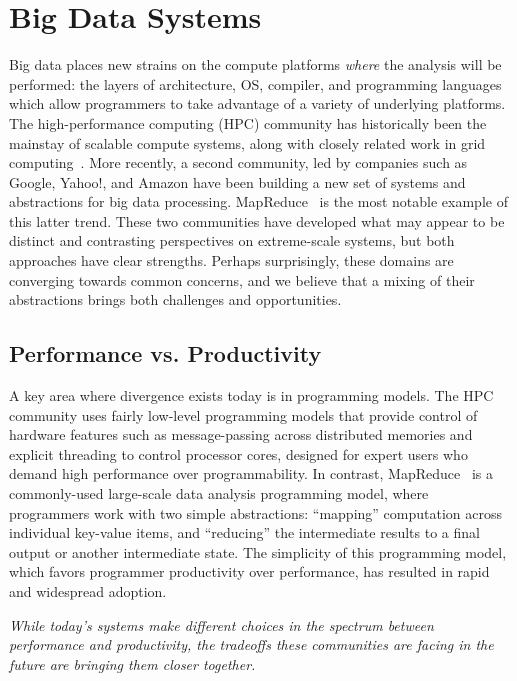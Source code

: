 \documentclass{article}
\begin{document}
\section{Big Data Systems}
\label{sec:big-data-systems}
Big data places new strains on the compute platforms \emph{where} the analysis
will be performed:  
the layers of architecture, OS, compiler, and programming languages which allow programmers to take advantage of a variety of underlying platforms.
The high-performance computing (HPC) community has historically been the mainstay of scalable compute systems, along with closely related work in grid computing~\cite{Globus}.  More recently, a second community, led by companies such as Google, Yahoo!, and Amazon have been building a new set of systems and abstractions for big data processing.  MapReduce~\cite{MapReduce} is the most notable example of this latter trend.
These two communities have developed what may appear to be distinct and contrasting perspectives on extreme-scale systems, but both approaches have clear strengths.  Perhaps surprisingly, these domains are converging towards common concerns, and we believe that a mixing of their abstractions brings both challenges and opportunities.

\subsection*{Performance vs. Productivity} 
A key area where divergence exists today is in programming models.
The HPC community uses fairly low-level programming models that provide control of hardware features such as message-passing across distributed memories and explicit threading to control processor cores, designed for expert users who demand high performance
over programmability.  In contrast, MapReduce~\cite{MapReduce} is a commonly-used large-scale data analysis programming model, where programmers work with two simple abstractions: ``mapping'' computation across individual key-value items, and ``reducing'' the intermediate results to a final output or another intermediate state.
The simplicity of this programming model, which favors programmer productivity over performance, has resulted in rapid and widespread adoption.

\begin{center}
\emph{While today's systems make different choices in the spectrum between performance and productivity,  the tradeoffs these communities are facing in the future are bringing them closer together.}
\end{center} 
\end{document}
